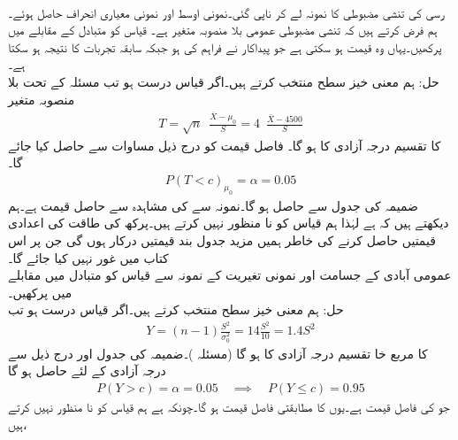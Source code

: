 \quad {}\\
رسی کی تنشی مضبوطی  کا نمونہ لے کر ناپی گئی۔نمونی اوسط  اور نمونی معیاری انحراف  حاصل ہوئے۔ ہم فرض کرتے ہیں کہ تنشی مضبوطی عمومی بلا منصوبہ  متغیر ہے۔ قیاس  کو متبادل  کے مقابلے میں پرکھیں۔یہاں  وہ قیمت ہو سکتی ہے جو پیداکار نے فراہم کی ہو جبکہ  سابقہ تجربات کا نتیجہ ہو سکتا ہے۔\\
حل:\quad
ہم معنی خیز سطح  منتخب کرتے ہیں۔اگر قیاس درست ہو تب مسئلہ  کے تحت  بلا منصوبہ متغیر
\begin{align*}
T=\sqrt{n}\,\,\,\frac{\overline{X}-\mu_0}{S}=4\,\,\, \frac{\overline{X}-4500}{S}
\end{align*}
کا  تقسیم  درجہ آزادی کا ہو گا۔ فاصل قیمت  کو درج ذیل مساوات سے حاصل کیا جائے گا۔
\begin{align*}
P(T<c)_{\mu_0}=\alpha=0.05
\end{align*}
ضمیمہ  کی جدول  سے  حاصل ہو گا۔نمونہ سے  کی مشاہدہ سے حاصل قیمت  ہے۔ہم دیکھتے ہیں کہ  ہے لہٰذا ہم قیاس کو نا منظور نہیں کرتے ہیں۔پرکھ کی طاقت کی اعدادی قیمتیں حاصل کرنے کی خاطر ہمیں مزید جدول بند قیمتیں درکار ہوں گی جن پر اس کتاب میں غور نہیں کیا جائے گا۔
\quad {}\\
عمومی آبادی کے  جسامت اور نمونی تغیریت   کے نمونہ سے قیاس  کو متبادل
  میں مقابلے میں پرکھیں۔\\
حل:\quad
ہم معنی خیز سطح  منتخب کرتے ہیں۔اگر قیاس درست ہو تب 
\begin{align*}
Y=(n-1)\frac{S^2}{\sigma^2_0}=14\frac{S^2}{10}=1.4S^2
\end{align*}
کا مربع خا تقسیم  درجہ آزادی کا ہو گا (مسئلہ )۔ضمیمہ  کی جدول  اور درج ذیل سے   درجہ آزادی کے لئے    حاصل ہو گا 
\begin{align*}
P(Y>c)=\alpha=0.05\quad \implies \quad P(Y\le c)=0.95
\end{align*}
جو  کی فاصل قیمت ہے۔یوں  کا مطابقتی فاصل قیمت  ہو گا۔چونکہ  ہے ہم قیاس کو نا منظور نہیں کرتے ہیں،

